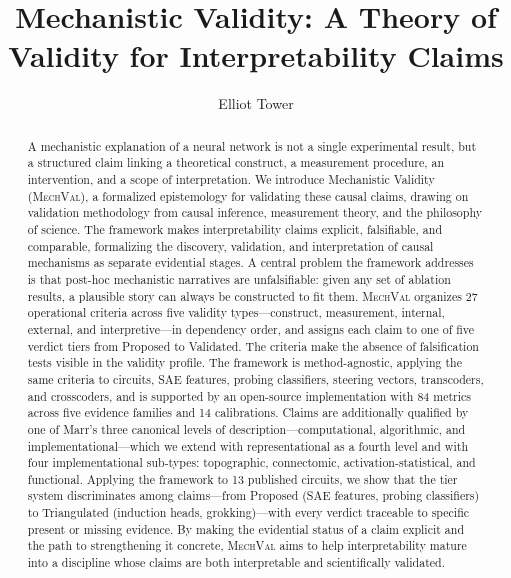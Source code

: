 \documentclass[10pt]{article}
\title{Mechanistic Validity: A Theory of Validity for Interpretability Claims}
\author[1]{Elliot Tower}
\affil[1]{Independent Researcher, \texttt{elliot@elliottower.com}}
\date{}
\newcommand{\mechval}{\textsc{MechVal}}
\begin{document}
\maketitle

\begin{abstract}
A mechanistic explanation of a neural network is not a single experimental result, but a structured claim linking a theoretical construct, a measurement procedure, an intervention, and a scope of interpretation. We introduce Mechanistic Validity (\mechval{}), a formalized epistemology for validating these causal claims, drawing on validation methodology from causal inference, measurement theory, and the philosophy of science. The framework makes interpretability claims explicit, falsifiable, and comparable, formalizing the discovery, validation, and interpretation of causal mechanisms as separate evidential stages. A central problem the framework addresses is that post-hoc mechanistic narratives are unfalsifiable: given any set of ablation results, a plausible story can always be constructed to fit them. \mechval{} organizes 27 operational criteria across five validity types---construct, measurement, internal, external, and interpretive---in dependency order, and assigns each claim to one of five verdict tiers from Proposed to Validated. The criteria make the absence of falsification tests visible in the validity profile. The framework is method-agnostic, applying the same criteria to circuits, SAE features, probing classifiers, steering vectors, transcoders, and crosscoders, and is supported by an open-source implementation with 84 metrics across five evidence families and 14 calibrations. Claims are additionally qualified by one of Marr's \citeyearpar{marr1982vision} three canonical levels of description---computational, algorithmic, and implementational---which we extend with representational as a fourth level and with four implementational sub-types: topographic, connectomic, activation-statistical, and functional. Applying the framework to 13 published circuits, we show that the tier system discriminates among claims---from Proposed (SAE features, probing classifiers) to Triangulated (induction heads, grokking)---with every verdict traceable to specific present or missing evidence. By making the evidential status of a claim explicit and the path to strengthening it concrete, \mechval{} aims to help interpretability mature into a discipline whose claims are both interpretable and scientifically validated.
\end{abstract}
\end{document}
